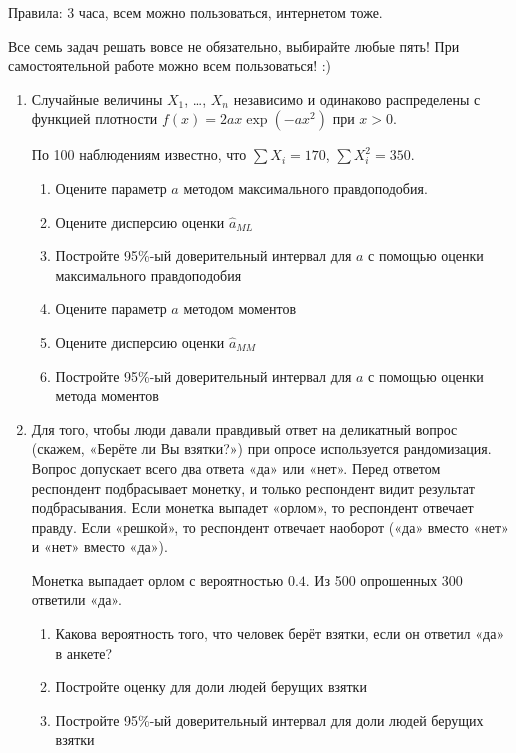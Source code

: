 Правила: 3 часа, всем можно пользоваться, интернетом тоже.

Все семь задач решать вовсе не обязательно, выбирайте любые пять!
При самостоятельной работе можно всем пользоваться! :)

\begin{enumerate}

\item Случайные величины $X_1$, \ldots, $X_n$ независимо и одинаково распределены
с функцией плотности $f(x)=2ax\exp(-ax^2)$ при $x>0$.

По 100 наблюдениям известно, что $\sum X_i = 170$, $\sum X_i^2 = 350$.

\begin{enumerate}
\item Оцените параметр $a$ методом максимального правдоподобия.
\item Оцените дисперсию оценки $\hat a_{ML}$
\item Постройте 95\%-ый доверительный интервал для $a$ с помощью оценки
максимального правдоподобия
\item Оцените параметр $a$ методом моментов
\item Оцените дисперсию оценки $\hat a_{MM}$
\item Постройте 95\%-ый доверительный интервал для $a$ с помощью оценки метода моментов
\end{enumerate}

\item Для того, чтобы люди давали правдивый ответ на деликатный вопрос (скажем,
«Берёте ли Вы взятки?») при опросе используется рандомизация. Вопрос допускает
всего два ответа «да» или «нет». Перед ответом респондент подбрасывает монетку,
и только респондент видит результат подбрасывания. Если монетка выпадет «орлом»,
то респондент отвечает правду. Если «решкой», то респондент отвечает наоборот
(«да» вместо «нет» и «нет» вместо «да»).

Монетка выпадает орлом с вероятностью $0.4$. Из 500 опрошенных 300 ответили «да».

\begin{enumerate}
\item Какова вероятность того, что человек берёт взятки, если он ответил «да» в анкете?
\item Постройте оценку для доли людей берущих взятки
\item Постройте 95\%-ый доверительный интервал для доли людей берущих взятки
\end{enumerate}


\end{enumerate}
